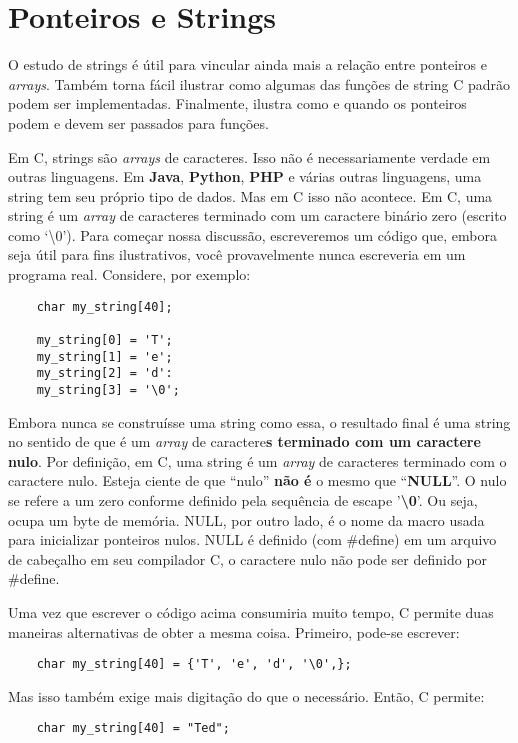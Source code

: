 
\chapter{Ponteiros e Strings}
O estudo de strings é útil para vincular ainda mais a relação entre ponteiros e \textit{arrays}. Também torna fácil ilustrar como algumas das funções de string C padrão podem ser implementadas. Finalmente, ilustra como e quando os ponteiros podem e devem ser passados para funções.

Em C, strings são \textit{arrays} de caracteres. Isso não é necessariamente verdade em outras linguagens. Em \textbf{Java}, \textbf{Python}, \textbf{PHP} e várias outras linguagens, uma string tem seu próprio tipo de dados. Mas em C isso não acontece. Em C, uma string é um \textit{array} de caracteres terminado com um caractere binário zero (escrito como `\textbackslash0'). Para começar nossa discussão, escreveremos um código que, embora seja útil para fins ilustrativos, você provavelmente nunca escreveria em um programa real. Considere, por exemplo:
\begin{lstlisting}
	char my_string[40];
	
	my_string[0] = 'T';
	my_string[1] = 'e';
	my_string[2] = 'd':
	my_string[3] = '\0';
\end{lstlisting}

Embora nunca se construísse uma string como essa, o resultado final é uma string no sentido de que é um \textit{array} de caractere\textbf{s terminado com um caractere nulo}. Por definição, em C, uma string é um \textit{array} de caracteres terminado com o caractere nulo. Esteja ciente de que ``nulo'' \textbf{não é} o mesmo que ``\textbf{NULL}''. O nulo se refere a um zero conforme definido pela sequência de escape '\textbf{\textbackslash0}'. Ou seja, ocupa um byte de memória. NULL, por outro lado, é o nome da macro usada para inicializar ponteiros nulos. NULL é definido (com \#define) em um arquivo de cabeçalho em seu compilador C, o caractere nulo não pode ser definido por \#define.

Uma vez que escrever o código acima consumiria muito tempo, C permite duas maneiras alternativas de obter a mesma coisa. Primeiro, pode-se escrever:
\begin{lstlisting}
	char my_string[40] = {'T', 'e', 'd', '\0',};
\end{lstlisting}

Mas isso também exige mais digitação do que o necessário. Então, C permite:
\begin{lstlisting}
	char my_string[40] = "Ted";
\end{lstlisting}

